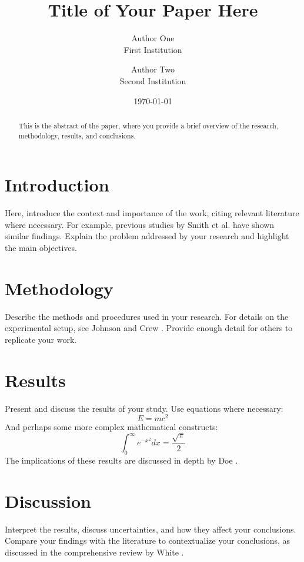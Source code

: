 \documentclass{article}
\begin{document}
\title{Title of Your Paper Here}

\author{Author One \\ First Institution \\ \and Author Two \\ Second Institution}

\date{\today}

\begin{abstract}
This is the abstract of the paper, where you provide a brief overview of the research, methodology, results, and conclusions.
\end{abstract}

\maketitle

\section{Introduction}
Here, introduce the context and importance of the work, citing relevant literature where necessary. For example, previous studies by Smith et al. \cite{Smith2020} have shown similar findings. Explain the problem addressed by your research and highlight the main objectives.

\section{Methodology}
Describe the methods and procedures used in your research. For details on the experimental setup, see Johnson and Crew \cite{Johnson2019}. Provide enough detail for others to replicate your work.

\section{Results}
Present and discuss the results of your study. Use equations where necessary:
\begin{equation}
    E = mc^2
\end{equation}
And perhaps some more complex mathematical constructs:
\begin{equation}
    \int_0^\infty e^{-x^2} dx = \frac{\sqrt{\pi}}{2}
\end{equation}
The implications of these results are discussed in depth by Doe \cite{Doe2018}.

\section{Discussion}
Interpret the results, discuss uncertainties, and how they affect your conclusions. Compare your findings with the literature to contextualize your conclusions, as discussed in the comprehensive review by White \cite{White2017}.
\end{document}
